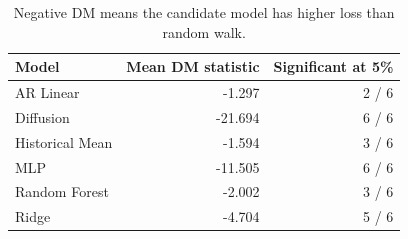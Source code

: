 \begin{table}[!htbp]
\centering
\caption{Diebold-Mariano comparison versus random walk.}
\label{tab:dm-summary}
\begin{tabular}{lrr}
\toprule
Model & Mean DM statistic & Significant at 5\% \\
\midrule
AR Linear & -1.297 & 2 / 6 \\
Diffusion & -21.694 & 6 / 6 \\
Historical Mean & -1.594 & 3 / 6 \\
MLP & -11.505 & 6 / 6 \\
Random Forest & -2.002 & 3 / 6 \\
Ridge & -4.704 & 5 / 6 \\
\bottomrule
\end{tabular}
\caption*{\footnotesize Negative DM means the candidate model has higher loss than random walk.}
\end{table}
